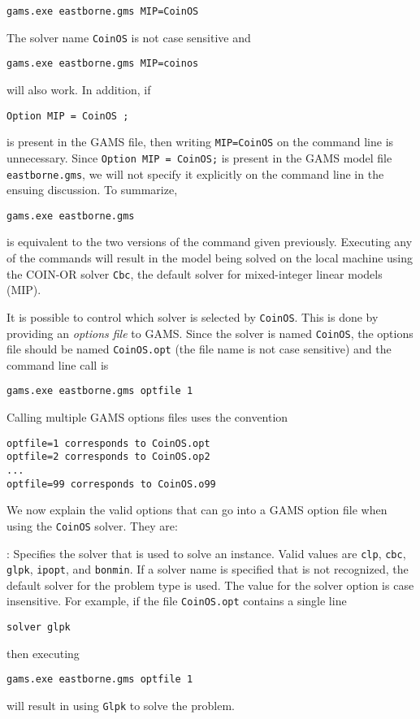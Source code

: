 \begin{verbatim}
gams.exe eastborne.gms MIP=CoinOS
\end{verbatim}
The solver name {\tt CoinOS} is not case sensitive and 
\begin{verbatim}
gams.exe eastborne.gms MIP=coinos
\end{verbatim}
will also work.  In addition, if
\begin{verbatim}
Option MIP = CoinOS ;
\end{verbatim}
is present in the GAMS file, then writing {\tt MIP=CoinOS} on the command line is unnecessary.
Since {\tt Option MIP = CoinOS;} is present in the GAMS model file {\tt eastborne.gms}, 
we will not specify it explicitly on the command line in the ensuing discussion. To summarize,
\begin{verbatim}
gams.exe eastborne.gms 
\end{verbatim}
is equivalent to the two versions of the command given previously.  Executing any of the commands will 
result in the model being solved on the local machine using the COIN-OR solver {\tt Cbc}, the default solver 
for 
mixed-integer linear models (MIP).

It is possible to control which solver is selected by {\tt CoinOS}.    This is done by providing an {\it options file}  to  GAMS.   
Since the solver is named {\tt  CoinOS}, the options file should  be named {\tt CoinOS.opt}  (the file name is not case sensitive)
and the command line call is 
\begin{verbatim}
gams.exe eastborne.gms optfile 1
\end{verbatim}
Calling multiple GAMS options files uses the convention
\begin{verbatim}
optfile=1 corresponds to CoinOS.opt
optfile=2 corresponds to CoinOS.op2
...
optfile=99 corresponds to CoinOS.o99
\end{verbatim}

We now explain the valid options that can go into a GAMS option file when using the {\tt CoinOS} solver.  They are:

\vskip 8pt
:   Specifies the solver that is used to solve an instance. 
Valid values are {\tt clp},  {\tt cbc}, {\tt glpk}, {\tt ipopt},  and {\tt bonmin}.  
If a solver name is specified that is not recognized, the default solver for the problem type is used.  
The value for the solver option is case insensitive. 
For example, if the file {\tt CoinOS.opt} contains a single line
\begin{verbatim}
solver glpk
\end{verbatim}
then executing
\begin{verbatim}
gams.exe eastborne.gms optfile 1
\end{verbatim}
will result in  using {\tt Glpk}  to solve the problem.   


